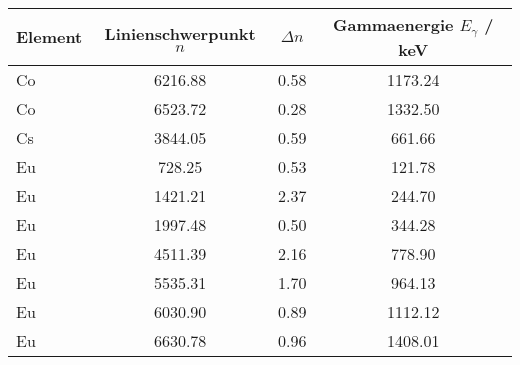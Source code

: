 \begin{tabular}{lSSS}
\toprule
Element & {Linienschwerpunkt $n$} & {$\Delta n$} & {Gammaenergie $E_{\gamma}$ / \si{\kilo\electronvolt}} \\ \midrule
Co      & 6216.88               & 0.58       & 1173.24      \\
Co      & 6523.72               & 0.28       & 1332.50      \\
Cs      & 3844.05               & 0.59       & 661.66       \\
Eu      & 728.25                & 0.53       & 121.78       \\
Eu      & 1421.21               & 2.37       & 244.70       \\
Eu      & 1997.48               & 0.50       & 344.28       \\
Eu      & 4511.39               & 2.16       & 778.90       \\
Eu      & 5535.31               & 1.70       & 964.13       \\
Eu      & 6030.90               & 0.89       & 1112.12      \\
Eu      & 6630.78               & 0.96       & 1408.01      \\ \bottomrule
\end{tabular}